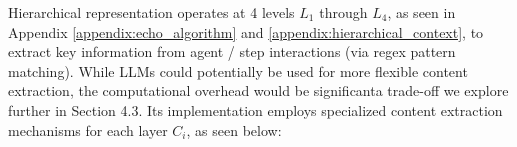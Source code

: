 \documentclass{article}
\begin{document}


Hierarchical representation operates at 4 levels $L_1$ through $L_4$, as seen in Appendix \ref{appendix:echo_algorithm} and \ref{appendix:hierarchical_context}, to extract key information from agent / step interactions (via regex pattern matching). While LLMs could potentially be used for more flexible content extraction, the computational overhead would be significant\textemdash a trade-off we explore further in Section 4.3. Its implementation employs specialized content extraction mechanisms for each layer $C_i$, as seen below: 


\end{document}
